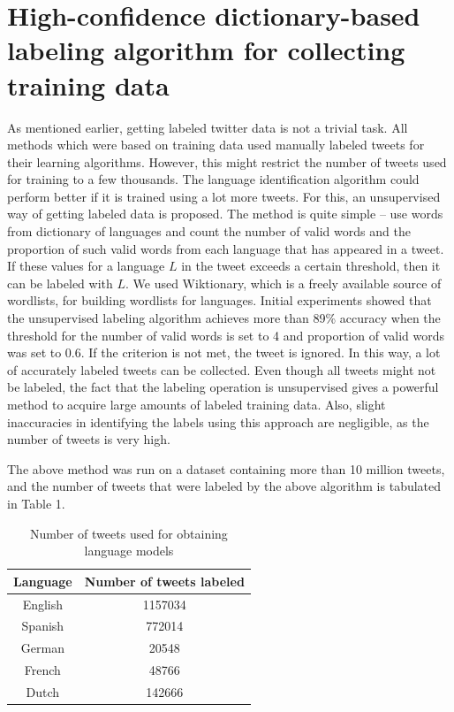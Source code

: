 \documentclass[11pt]{article}
\begin{document}
\section{High-confidence dictionary-based labeling algorithm for collecting training data}
As mentioned earlier, getting labeled twitter data is not a trivial task. All methods which were based on training data used manually labeled tweets for their learning algorithms. However, this might restrict the number of tweets used for training to a few thousands. The language identification algorithm could perform better if it is trained using a lot more tweets. For this, an unsupervised way of getting labeled data is proposed. The method is quite simple -- use words from dictionary of languages and count the number of valid words and the proportion of such valid words from each language that has appeared in a tweet. If these values for a language $L$ in the tweet exceeds a certain threshold, then it can be labeled with $L$. We used Wiktionary, which is a freely available source of wordlists, for building wordlists for languages. Initial experiments showed that the unsupervised labeling algorithm achieves more than 89\% accuracy when the threshold for the number of valid words is set to 4 and proportion of valid words was set to 0.6. If the criterion is not met, the tweet is ignored. In this way, a lot of accurately labeled tweets can be collected. Even though all tweets might not be labeled, the fact that the labeling operation is unsupervised gives a powerful method to acquire large amounts of labeled training data. Also, slight inaccuracies in identifying the labels using this approach are negligible, as the number of tweets is very high.

The above method was run on a dataset containing more than 10 million tweets, and the number of tweets that were labeled by the above algorithm is tabulated in Table 1.

\begin{table}
\begin{center}
\small
\begin{tabular}{|c|c|}
\hline
\textbf{Language} & \textbf{Number of tweets labeled} \\
\hline
English & 1157034 \\
Spanish & 772014 \\
German & 20548 \\
French & 48766 \\
Dutch & 142666 \\ \hline
\end{tabular}
\caption{\footnotesize Number of tweets used for obtaining language models}
\end{center}
\end{table}
\end{document}
